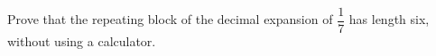 Prove that the repeating block of the decimal expansion of $\dfrac{1}{7}$ has length six, without using a calculator.
